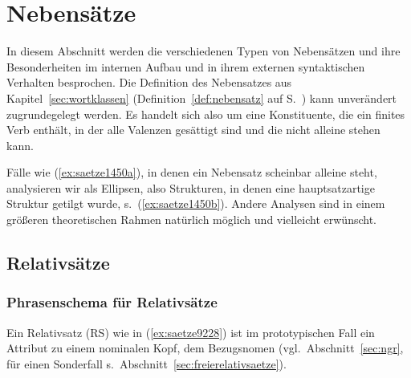 \section{Nebensätze}

\label{sec:nebensaetze}

In diesem Abschnitt werden die verschiedenen Typen von Nebensätzen und ihre Besonderheiten im internen Aufbau und in ihrem externen syntaktischen Verhalten besprochen.
Die Definition des Nebensatzes aus Kapitel~\ref{sec:wortklassen} (Definition~\ref{def:nebensatz} auf S.~\pageref{def:nebensatz}) kann unverändert zugrundegelegt werden.
Es handelt sich also um eine Konstituente, die ein finites Verb enthält, in der alle Valenzen gesättigt sind und die nicht alleine stehen kann.

Fälle wie (\ref{ex:saetze1450a}), in denen ein Nebensatz scheinbar alleine steht, analysieren wir als Ellipsen, also Strukturen, in denen eine hauptsatzartige Struktur getilgt wurde, s.\ (\ref{ex:saetze1450b}).
Andere Analysen sind in einem größeren theoretischen Rahmen natürlich möglich und vielleicht erwünscht.

\begin{exe}
  \ex\label{ex:saetze1450} 
  \begin{xlist}
  \end{xlist}
\end{exe}

\subsection{Relativsätze}

\label{sec:relativsaetze}

\subsubsection{Phrasenschema für Relativsätze}

\label{sec:strukturschemarelativsatz}

Ein Relativsatz (RS) wie in (\ref{ex:saetze9228}) ist im prototypischen Fall ein Attribut zu einem nominalen Kopf, dem Bezugsnomen (vgl.\ Abschnitt~\ref{sec:ngr}, für einen Sonderfall s.\ Abschnitt~\ref{sec:freierelativsaetze}).

\begin{exe}
\end{exe}

